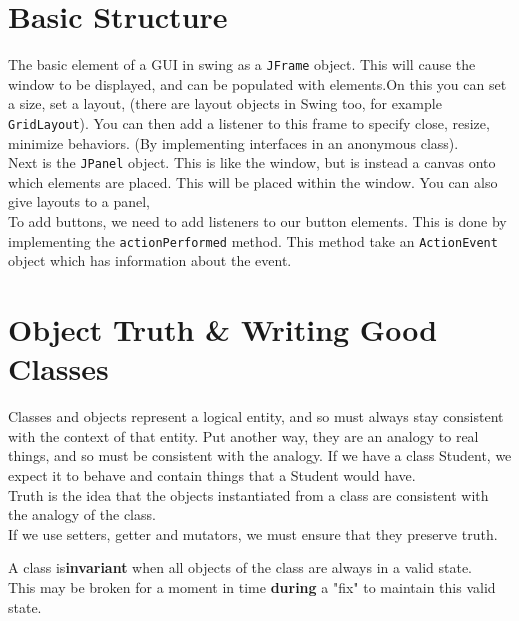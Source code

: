 \documentclass[12pt]{article}
\theoremstyle{definition}
\begin{document}
\section{Basic Structure}
The basic element of a GUI in swing as a \texttt{JFrame} object. This will cause the window to be displayed, and can be populated with elements.On this you can set a size, set a layout, (there are layout objects in Swing too, for example \texttt{GridLayout}). You can then add a listener to this frame to specify close, resize, minimize behaviors. (By implementing interfaces in an anonymous class).
\\ \linebreak
Next is the \texttt{JPanel} object. This is like the window, but is instead a canvas onto which elements are placed. This will be placed within the window. You can also give layouts to a panel, 
\\ \linebreak
To add buttons, we need to add listeners to our button elements. This is done by implementing the \texttt{actionPerformed} method. This method take an \texttt{ActionEvent} object which has information about the event. 
\\ \linebreak

\section{Object Truth \& Writing Good Classes}
Classes and objects represent a logical entity, and so must always stay consistent with the context of that entity. Put another way, they are an analogy to real things, and so must be consistent with the analogy. If we have a class Student, we expect it to behave and contain things that a Student would have. 
\\ \linebreak
Truth is the idea that the objects instantiated from a class are consistent with the analogy of the class.
\\ \linebreak
If we use setters, getter and mutators, we must ensure that they preserve truth.
\\ \linebreak

A class is\textbf{invariant} when all objects of the class are always in a valid state. 
\\ \linebreak
This may be broken for a moment in time \textbf{during} a "fix" to maintain this valid state.
\\ \linebreak
\end{document}
